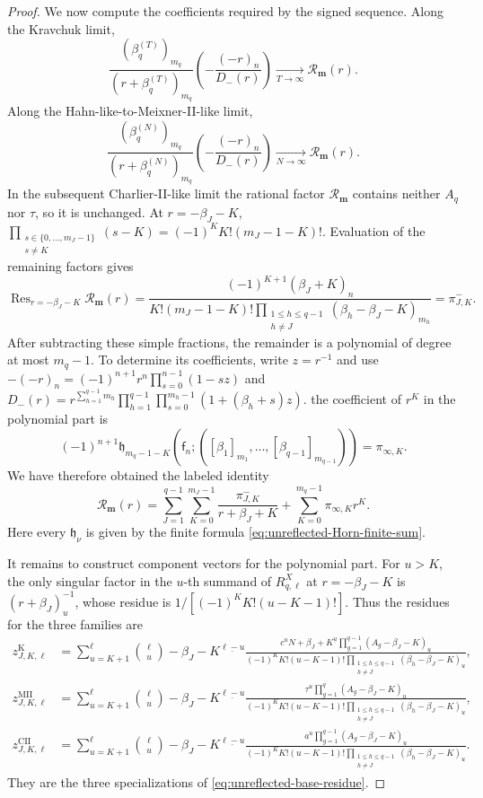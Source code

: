\documentclass[10pt]{amsart}
\newcommand{\mm}{\boldsymbol m}
\newcommand{\fall}[2]{#1^{\underline{#2}}}
\DeclareMathOperator*{\Res}{Res}
\theoremstyle{plain}
\theoremstyle{definition}
\theoremstyle{remark}
\begin{document}
\begin{proof}
We now compute the coefficients required by the signed sequence. Along the
Kravchuk limit,
\[
 \frac{(\beta_q^{(T)})_{m_q}}{(r+\beta_q^{(T)})_{m_q}}
 \left(-\frac{(-r)_n}{D_-(r)}\right)
 \xrightarrow[T\to\infty]{}\mathcal R_{\mm}(r).
\]
Along the Hahn-like-to-Meixner-II-like limit,
\[
 \frac{(\beta_q^{(N)})_{m_q}}{(r+\beta_q^{(N)})_{m_q}}
 \left(-\frac{(-r)_n}{D_-(r)}\right)
 \xrightarrow[N\to\infty]{}\mathcal R_{\mm}(r).
\]
In the subsequent Charlier-II-like limit the
rational factor \(\mathcal R_{\mm}\) contains neither \(A_q\) nor \(\tau\), so
it is unchanged. At \(r=-\beta_J-K\),
\(\prod_{\substack{s\in\{0,\ldots,m_J-1\}\\s\ne K}}(s-K)
=(-1)^K K!(m_J-1-K)!\).
Evaluation of the remaining factors gives
\[
 \Res_{r=-\beta_J-K}\mathcal R_{\mm}(r)
 =\frac{(-1)^{K+1}(\beta_J+K)_n}
 {K!(m_J-1-K)!
  \prod_{\substack{1\le h\le q-1\\h\ne J}}
  (\beta_h-\beta_J-K)_{m_h}}
 =\pi_{J,K}^{-}.
\]
After subtracting these simple fractions, the remainder is a polynomial
of degree at most \(m_q-1\). To determine its coefficients, write
\(z=r^{-1}\) and use
\(-(-r)_n=(-1)^{n+1}r^n\prod_{s=0}^{n-1}(1-sz)\) and
\(D_-(r)=r^{\sum_{h=1}^{q-1}m_h}
\prod_{h=1}^{q-1}\prod_{s=0}^{m_h-1}(1+(\beta_h+s)z)\).
the coefficient of \(r^K\) in the polynomial part is
\[
 (-1)^{n+1}
 \mathfrak h_{m_q-1-K}
 \left(\mathsf f_n;
 ([\beta_1]_{m_1},\ldots,[\beta_{q-1}]_{m_{q-1}})\right)
 =\pi_{\infty,K}.
\]
We have therefore obtained the labeled identity
\begin{equation}
 \mathcal R_{\mm}(r)=
 \sum_{J=1}^{q-1}\sum_{K=0}^{m_J-1}
 \frac{\pi_{J,K}^{-}}{r+\beta_J+K}
 +\sum_{K=0}^{m_q-1}\pi_{\infty,K}r^K.
 \label{eq:unreflected-target-partial-fractions}
\end{equation}
Here every \(\mathfrak h_\nu\) is given by the finite formula
\eqref{eq:unreflected-Horn-finite-sum}.

It remains to construct component vectors for the polynomial part.  For
\(u>K\), the only singular factor in the \(u\)-th summand of
\(R_{q,\ell}^X\) at \(r=-\beta_J-K\) is \((r+\beta_J)_u^{-1}\), whose
residue is \(1/[(-1)^K K!(u-K-1)!]\).
Thus the residues for the three families are
\begin{align*}
 z_{J,K,\ell}^{\mathrm K}
 &=\sum_{u=K+1}^{\ell}\binom\ell u
 \fall{-\beta_J-K}{\ell-u}
 \frac{c^u\fall{N+\beta_J+K}{u}
       \prod_{g=1}^{q-1}(A_g-\beta_J-K)_u}
 {(-1)^K K!(u-K-1)!
  \prod_{\substack{1\le h\le q-1\\h\ne J}}
  (\beta_h-\beta_J-K)_u},\\
 z_{J,K,\ell}^{\mathrm{MII}}
 &=\sum_{u=K+1}^{\ell}\binom\ell u
 \fall{-\beta_J-K}{\ell-u}
 \frac{\tau^u\prod_{g=1}^{q}(A_g-\beta_J-K)_u}
 {(-1)^K K!(u-K-1)!
  \prod_{\substack{1\le h\le q-1\\h\ne J}}
  (\beta_h-\beta_J-K)_u},\\
 z_{J,K,\ell}^{\mathrm{CII}}
 &=\sum_{u=K+1}^{\ell}\binom\ell u
 \fall{-\beta_J-K}{\ell-u}
 \frac{a^u\prod_{g=1}^{q-1}(A_g-\beta_J-K)_u}
 {(-1)^K K!(u-K-1)!
  \prod_{\substack{1\le h\le q-1\\h\ne J}}
  (\beta_h-\beta_J-K)_u}.
\end{align*}
They are the three specializations of
\eqref{eq:unreflected-base-residue}.


\end{proof}
\end{document}
